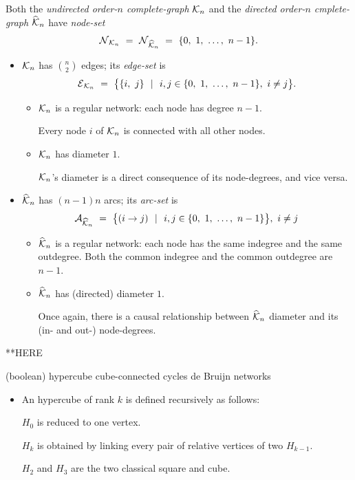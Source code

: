 Both the {\it undirected order-$n$ complete-graph} $\mbox{$\cal K$}_n$ and the {\it
  directed order-$n$ cmplete-graph} $\widehat{\mbox{$\cal K$}}_n$  have {\it node-set} 
\[ \mbox{$\cal N$}_{{\cal K}_n} \ = \ \mbox{$\cal N$}_{\widehat{{\cal K}}_n}
\ = \ \{ 0, \ 1, \ \ldots, \ n-1\}. \]
\begin{itemize}
\item
$\mbox{$\cal K$}_n$ has $\displaystyle {n \choose 2}$ edges; its {\it edge-set} is
\[ \mbox{$\cal E$}_{{\cal K}_n} \ = \
\big\{ \{i, \ j\} \ \ | \ \ i,j \in \{0, \ 1, \ \ldots, \ n-1\}, \ i
\neq j \big\}.
\]
  \begin{itemize}
  \item
$\mbox{$\cal K$}_n$ is a regular network: each node has degree $n-1$.

Every node $i$ of $\mbox{$\cal K$}_n$ is connected with all other nodes.

   \item
$\mbox{$\cal K$}_n$ has diameter $1$.

$\mbox{$\cal K$}_n$'s diameter is a direct consequence of its node-degrees, and vice versa.
  \end{itemize}

\item
$\widehat{\mbox{$\cal K$}}_n$ has $(n-1)n$ arcs; its {\it arc-set} is
\[ \a_{\widehat{{\cal K}}_n} \ = \ 
\big\{ (i \rightarrow j) \ \ | \ \ i,j \in \{0, \ 1, \ \ldots, \ n-1\}
\big\}, \ i \neq j
\]
  \begin{itemize}
  \item
$\widehat{\mbox{$\cal K$}}_n$ is a regular network: each node has the same indegree
    and the same outdegree.  Both the common indegree and the common
    outdegree are $n-1$.
  \item
$\widehat{\mbox{$\cal K$}}_n$ has (directed) diameter $1$.

Once again, there is a causal relationship between $\widehat{\mbox{$\cal K$}}_n$
diameter and its (in- and out-) node-degrees.
  \end{itemize}
\end{itemize}

**HERE



(boolean) hypercube
cube-connected cycles
de Bruijn networks

\bigskip

\begin{itemize}
\item An hypercube of rank $k$ is defined recursively as follows:

$H_0$ is reduced to one vertex.

$H_k$ is obtained by linking every pair of relative vertices of two $H_{k-1}$.

$H_2$ and $H_3$ are the two classical square and cube.
\end{itemize}

